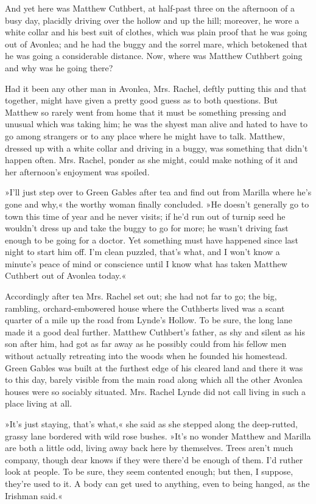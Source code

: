 And yet here was Matthew Cuthbert, at half-past three on the afternoon of a busy day, placidly driving over the hollow and up the hill; moreover, he wore a white collar and his best suit of clothes, which was plain proof that he was going out of Avonlea; and he had the buggy and the sorrel mare, which betokened that he was going a considerable distance. Now, where was Matthew Cuthbert going and why was he going there?

Had it been any other man in Avonlea, Mrs. Rachel, deftly putting this and that together, might have given a pretty good guess as to both questions. But Matthew so rarely went from home that it must be something pressing and unusual which was taking him; he was the shyest man alive and hated to have to go among strangers or to any place where he might have to talk. Matthew, dressed up with a white collar and driving in a buggy, was something that didn’t happen often. Mrs. Rachel, ponder as she might, could make nothing of it and her afternoon’s enjoyment was spoiled.

»I’ll just step over to Green Gables after tea and find out from Marilla where he’s gone and why,« the worthy woman finally concluded. »He doesn’t generally go to town this time of year and he never visits; if he’d run out of turnip seed he wouldn’t dress up and take the buggy to go for more; he wasn’t driving fast enough to be going for a doctor. Yet something must have happened since last night to start him off. I’m clean puzzled, that’s what, and I won’t know a minute’s peace of mind or conscience until I know what has taken Matthew Cuthbert out of Avonlea today.«

Accordingly after tea Mrs. Rachel set out; she had not far to go; the big, rambling, orchard-embowered house where the Cuthberts lived was a scant quarter of a mile up the road from Lynde’s Hollow. To be sure, the long lane made it a good deal further. Matthew Cuthbert’s father, as shy and silent as his son after him, had got as far away as he possibly could from his fellow men without actually retreating into the woods when he founded his homestead. Green Gables was built at the furthest edge of his cleared land and there it was to this day, barely visible from the main road along which all the other Avonlea houses were so sociably situated. Mrs. Rachel Lynde did not call living in such a place living at all.

»It’s just staying, that’s what,« she said as she stepped along the deep-rutted, grassy lane bordered with wild rose bushes. »It’s no wonder Matthew and Marilla are both a little odd, living away back here by themselves. Trees aren’t much company, though dear knows if they were there’d be enough of them. I’d ruther look at people. To be sure, they seem contented enough; but then, I suppose, they’re used to it. A body can get used to anything, even to being hanged, as the Irishman said.«

